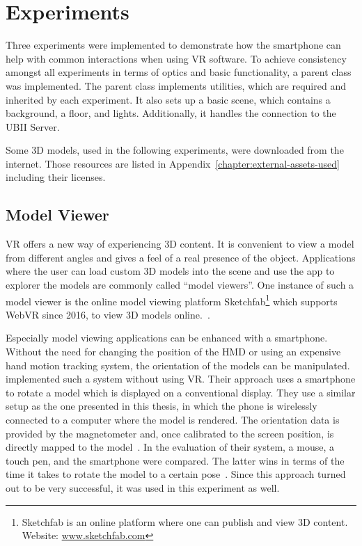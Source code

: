\section{Experiments}\label{section:experiments}

Three experiments were implemented to demonstrate how the smartphone can help with common interactions when using \gls{VR} software.
To achieve consistency amongst all experiments in terms of optics and basic functionality, a parent class was implemented. The parent class implements utilities, which are required and inherited by each experiment. It also sets up a basic scene, which contains a background, a floor, and lights. Additionally, it handles the connection to the \gls{UBII} Server.

Some \gls{3D} models, used in the following experiments, were downloaded from the internet. Those resources are listed in Appendix~\ref{chapter:external-assets-used} including their licenses.


\subsection{Model Viewer}\label{subsection:model-viewer}

\acrlong{VR} offers a new way of experiencing \gls{3D} content. It is convenient to view a model from different angles and gives a feel of a real presence of the object. Applications where the user can load custom \gls{3D} models into the scene and use the app to explorer the models are commonly called \enquote{model viewers}. One instance of such a model viewer is the online model viewing platform Sketchfab\footnote{Sketchfab is an online platform where one can publish and view \gls{3D} content. Website: \href{https://sketchfab.com}{www.sketchfab.com}} which supports Web\gls{VR} since 2016, to view \gls{3D} models online.~\cite{Denoyel.2016}. 

Especially model viewing applications can be enhanced with a smartphone. Without the need for changing the position of the \gls{HMD} or using an expensive hand motion tracking system, the orientation of the models can be manipulated.
\citeauthor{Katzakis.2010} implemented such a system without using \gls{VR}. Their approach uses a smartphone to rotate a model which is displayed on a conventional display. They use a similar setup as the one presented in this thesis, in which the phone is wirelessly connected to a computer where the model is rendered. The orientation data is provided by the magnetometer and, once calibrated to the screen position, is directly mapped to the model~\cite[139]{Katzakis.2010}. In the evaluation of their system, a mouse, a touch pen, and the smartphone were compared. The latter wins in terms of the time it takes to rotate the model to a certain pose~\cite[140]{Katzakis.2010}.
Since this approach turned out to be very successful, it was used in this experiment as well.

